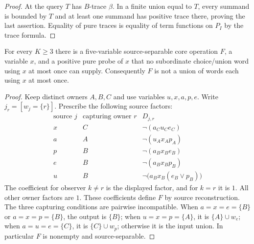 \begin{proof}
At the query $T$ has $B$-trace $\beta$. In a finite union equal to
$T$, every summand is bounded by $T$ and at least one summand has
positive trace there, proving the last assertion. Equality of pure
traces is equality of term functions on $P_I$ by the trace formula.
\end{proof}

\begin{proposition}
\label{core:prop:separable-source-repetition}
For every $K\geq3$ there is a five-variable source-separable core
operation $F$, a variable $x$, and a positive pure probe of $x$ that
no subordinate choice/union word using $x$ at most once can supply.
Consequently $F$ is not a union of words each using $x$ at most once.
\end{proposition}
\begin{proof}
Keep distinct owners $A,B,C$ and use variables $u,x,a,p,e$.
Write $j_r=[w_j=\{r\}]$. Prescribe the following source factors:
\[
\begin{array}{c|c|c}
 \text{source }j&\text{capturing owner }r& D_{j,r}\\\hline
 x&C&\neg(a_Cu_Ce_C)\\
 a&A&\neg(u_Ax_Ap_A)\\
 p&B&\neg(a_Bx_Be_B)\\
 e&B&\neg(a_Bx_Bp_B)\\
 u&B&\neg\bigl(a_Bx_B(e_B\vee p_B)\bigr)
\end{array}
\]
The coefficient for observer $k\ne r$ is the displayed factor,
and for $k=r$ it is $1$. All other owner factors are $1$.
These coefficients define $F$ by source reconstruction.
The three capturing conditions are pairwise incompatible.
When $a=x=e=\{B\}$ or $a=x=p=\{B\}$, the output is $\{B\}$;
when $u=x=p=\{A\}$, it is $\{A\}\cup w_e$; when
$a=u=e=\{C\}$, it is $\{C\}\cup w_p$; otherwise it is the input
union. In particular $F$ is nonempty and source-separable.


\end{proof}
